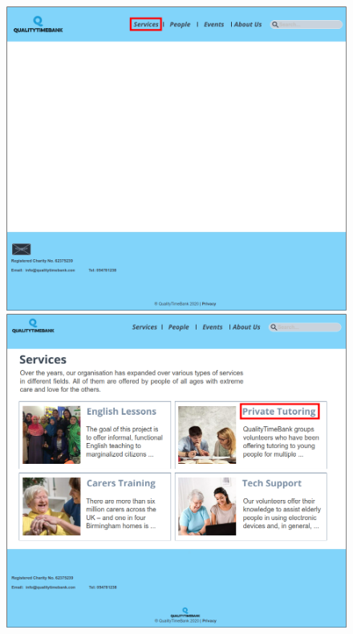 \documentclass[a4paper, 11pt, parskip=half, headsepline]{scrreprt}
\begin{document}
\begin{figure}[H]
    \begin{minipage}[t]{0.5\textwidth}
        \centering
    	\includegraphics[width=1\linewidth, keepaspectratio]{scenarios/scenario-11}
    	\caption{}
    	\label{fig:scenario-11}
    \end{minipage}
    \hspace*{\fill}
    \begin{minipage}[t]{0.5\textwidth}
        \centering
    	\includegraphics[width=1\linewidth, keepaspectratio]{scenarios/scenario-12}
    	\caption{}
    	\label{fig:scenario-12}
    \end{minipage}
\end{figure}
\end{document}
